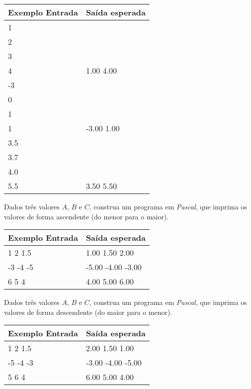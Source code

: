 \begin{center}
\begin{tabular}{|l|l|} \hline
Exemplo Entrada & Saída esperada \\ \hline
1                &                \\ 
2                &                \\ 
3                &                \\ 
4                & 1.00 4.00               \\ \hline
-3                &                \\ 
0               &                \\ 
1               &                \\ 
1               &  -3.00 1.00              \\ \hline
3.5                &                \\
3.7                &                \\
4.0                &                \\
5.5                & 3.50 5.50               \\ \hline
\end{tabular}
\end{center}

\item Dados três valores $A$, $B$ e $C$, construa um programa em \emph{Pascal},
 que imprima os valores de forma ascendente (do menor para o maior).

\begin{center}
\begin{tabular}{|l|l|} \hline
Exemplo Entrada & Saída esperada \\ \hline
1 2 1.5                & 1.00 1.50 2.00               \\ \hline
-3 -4 -5              & -5.00 -4.00 -3.00               \\ \hline
6 5 4                & 4.00 5.00 6.00               \\ \hline
\end{tabular}
\end{center}

\item Dados três valores $A$, $B$ e $C$, construa um programa em \emph{Pascal},
 que imprima os valores de forma descendente (do maior para o menor).

\begin{center}
\begin{tabular}{|l|l|} \hline
Exemplo Entrada & Saída esperada \\ \hline
1 2 1.5                & 2.00 1.50 1.00               \\ \hline
-5 -4 -3                & -3.00 -4.00 -5.00                \\ \hline
5 6 4                & 6.00 5.00 4.00               \\ \hline
\end{tabular}
\end{center}


